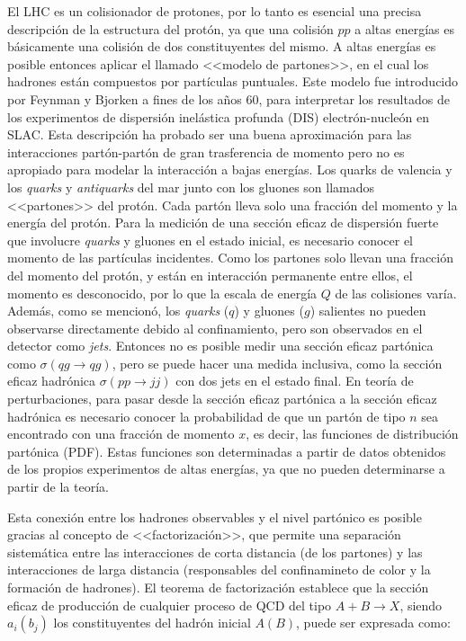 El LHC es un colisionador de protones, por lo tanto es esencial una precisa
descripción de la estructura del protón, ya que una colisión $pp$ a altas
energías es básicamente una colisión de dos constituyentes del mismo.
A altas energías es posible entonces aplicar el llamado <<modelo de
partones>>, en el cual los hadrones están compuestos por partículas puntuales.
Este modelo fue introducido por Feynman \cite{PhysRevLett.23.1415} y Bjorken
\cite{PhysRev.185.1975} a fines de los a\~nos 60, para interpretar los
resultados de los experimentos de dispersión inelástica profunda (DIS)
electrón-nucleón en SLAC. Esta descripción ha probado ser una buena aproximación
para las interacciones partón-partón de gran trasferencia de momento pero no es
apropiado para modelar la interacción a bajas energías. Los quarks de valencia y
los \emph{quarks} y \emph{antiquarks} del mar junto con los gluones son llamados
<<partones>> del protón. Cada partón lleva solo una fracción del momento y la
energía del protón. Para la medición de una sección eficaz de dispersión fuerte
que involucre \emph{quarks} y gluones en el estado inicial, es necesario conocer el
momento de las partículas incidentes. Como los partones solo llevan una fracción
del momento del protón, y están en interacción permanente entre ellos, el momento es
desconocido, por lo que la escala de energía $Q$ de las colisiones varía. Además,
como se mencionó, los \emph{quarks} ($q$) y
gluones ($g$) salientes no pueden observarse directamente debido al confinamiento,
pero son observados en el detector como \emph{jets}. Entonces no es posible
medir una sección eficaz partónica como $\sigma(qg \to qg)$, pero se puede hacer
una medida inclusiva, como la sección eficaz hadrónica $\sigma(pp \to jj)$ con
dos jets en el estado final. En teoría de perturbaciones, para pasar desde la
sección eficaz partónica a la sección eficaz hadrónica es necesario conocer la
probabilidad de que un partón de tipo $n$ sea encontrado con una fracción de
momento $x$, es decir, las funciones de distribución partónica (PDF). Estas
funciones son determinadas a partir de datos obtenidos de los propios
experimentos de altas energías, ya que no pueden determinarse a partir de la
teoría.

Esta conexión entre los hadrones observables y el nivel partónico es posible
gracias al concepto de <<factorización>>, que permite una separación
sistemática entre las interacciones de corta distancia (de los partones) y las
interacciones de larga distancia (responsables del confinamineto de color y la
formación de hadrones). El teorema de factorización \cite{Ellis1978281}
establece que la sección eficaz de producción de cualquier proceso de QCD del
tipo $A+B\to X$, siendo $a_i(b_j)$ los constituyentes del hadrón inicial $A(B)$,
puede ser expresada como:

